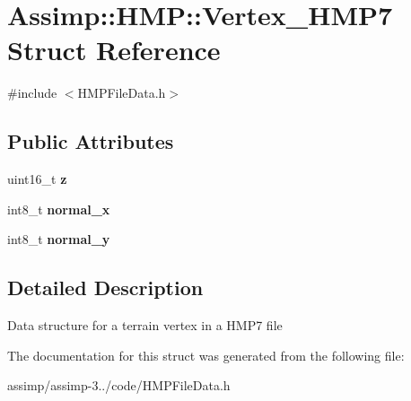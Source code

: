 \hypertarget{struct_assimp_1_1_h_m_p_1_1_vertex___h_m_p7}{\section{Assimp\+:\+:H\+M\+P\+:\+:Vertex\+\_\+\+H\+M\+P7 Struct Reference}
\label{struct_assimp_1_1_h_m_p_1_1_vertex___h_m_p7}
}


{\ttfamily \#include $<$H\+M\+P\+File\+Data.\+h$>$}

\subsection*{Public Attributes}
\begin{DoxyCompactItemize}
\item 
\hypertarget{struct_assimp_1_1_h_m_p_1_1_vertex___h_m_p7_aa59bd32c920bb1c90abea2f7057b7601}{uint16\+\_\+t {\bfseries z}}\label{struct_assimp_1_1_h_m_p_1_1_vertex___h_m_p7_aa59bd32c920bb1c90abea2f7057b7601}

\item 
\hypertarget{struct_assimp_1_1_h_m_p_1_1_vertex___h_m_p7_ab484308b427d3d5fe7c389d1b88d12b7}{int8\+\_\+t {\bfseries normal\+\_\+x}}\label{struct_assimp_1_1_h_m_p_1_1_vertex___h_m_p7_ab484308b427d3d5fe7c389d1b88d12b7}

\item 
\hypertarget{struct_assimp_1_1_h_m_p_1_1_vertex___h_m_p7_a34642814ad7948741ae98d89348e85cc}{int8\+\_\+t {\bfseries normal\+\_\+y}}\label{struct_assimp_1_1_h_m_p_1_1_vertex___h_m_p7_a34642814ad7948741ae98d89348e85cc}

\end{DoxyCompactItemize}


\subsection{Detailed Description}
Data structure for a terrain vertex in a H\+M\+P7 file 

The documentation for this struct was generated from the following file\+:\begin{DoxyCompactItemize}
\item 
assimp/assimp-\/3../code/H\+M\+P\+File\+Data.\+h\end{DoxyCompactItemize}
